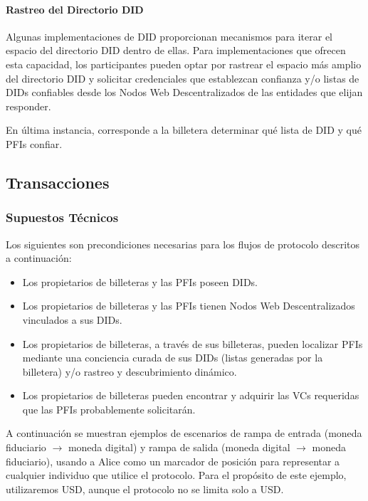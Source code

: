 \documentclass[11pt]{article}
\begin{document}
\paragraph{Rastreo del Directorio DID}

Algunas implementaciones de DID proporcionan mecanismos para iterar el espacio del directorio DID dentro de ellas. Para implementaciones que ofrecen esta capacidad, los participantes pueden optar por rastrear el espacio más amplio del directorio DID y solicitar credenciales que establezcan confianza y/o listas de DIDs confiables desde los Nodos Web Descentralizados de las entidades que elijan responder.

\vspace{1\baselineskip}
En última instancia, corresponde a la billetera determinar qué lista de DID y qué PFIs confiar.

\vspace{1\baselineskip}
\subsection{Transacciones}

\subsubsection{Supuestos Técnicos}

Los siguientes son precondiciones necesarias para los flujos de protocolo descritos a continuación:

\begin{itemize}
	\item Los propietarios de billeteras y las PFIs poseen DIDs.

	\item Los propietarios de billeteras y las PFIs tienen Nodos Web Descentralizados vinculados a sus DIDs.

	\item Los propietarios de billeteras, a través de sus billeteras, pueden localizar PFIs mediante una conciencia curada de sus DIDs (listas generadas por la billetera) y/o rastreo y descubrimiento dinámico.

	\item Los propietarios de billeteras pueden encontrar y adquirir las VCs requeridas que las PFIs probablemente solicitarán.

\vspace{1\baselineskip}
\end{itemize}
A continuación se muestran ejemplos de escenarios de rampa de entrada (moneda fiduciario $\rightarrow$ moneda digital) y rampa de salida (moneda digital $\rightarrow$ moneda fiduciario), usando a Alice como un marcador de posición para representar a cualquier individuo que utilice el protocolo. Para el propósito de este ejemplo, utilizaremos USD, aunque el protocolo no se limita solo a USD.
\end{document}
